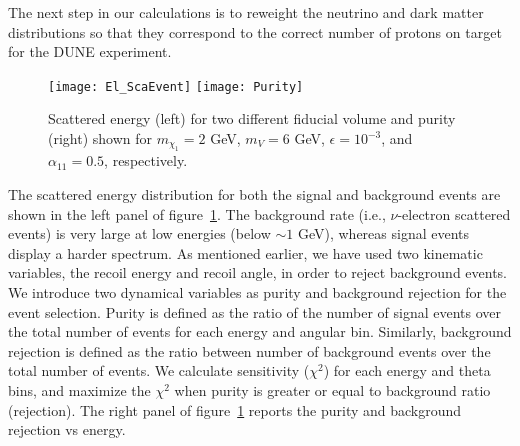     The next step in our calculations is to reweight the neutrino and dark
matter distributions so that they correspond to the correct number of protons
on target for the DUNE experiment. 
 \begin{figure}[!h]
 \centering
 \texttt{[image: El\_ScaEvent]}
 \texttt{[image: Purity]}
 \caption{\label{fig:scatter_E} Scattered energy (left) for two different fiducial volume and purity (right) shown for $m_{\chi_1}=2$ GeV, $m_{V}=6$ GeV, $\epsilon=10^{-3}$, and $\alpha_{11}=0.5$, respectively. }
 \end{figure}
The scattered energy distribution for both the signal and background events are shown in the left panel of figure~\ref{fig:scatter_E}.
The background rate (i.e., $\nu$-electron scattered events) is very large at low energies (below $\sim 1$ GeV), whereas signal events display a harder spectrum. 
As mentioned earlier, we have used two kinematic variables, the recoil energy and recoil angle, in order to reject background events. 
We introduce two dynamical variables as purity and background rejection for the event selection. 
Purity is defined as the ratio of the number of signal events over the total number of events for each energy and angular bin. 
Similarly, background rejection is defined as the ratio between number of background events over the total number of events. 
We calculate sensitivity ($\chi^{2}$) for each energy and theta bins, and maximize the $\chi^{2}$ when purity is greater or equal to background ratio (rejection). The right panel of figure~\ref{fig:scatter_E} reports the purity and background rejection vs energy.
